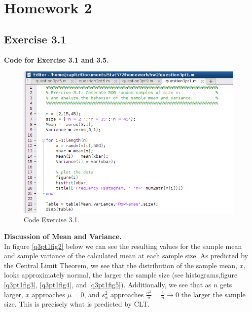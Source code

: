 \documentclass[12pt,a4paper]{article}
\begin{document}
\FloatBarrier

\section*{Homework 2}

\subsection*{Exercise 3.1}
\textbf{Code for Exercise 3.1 and 3.5.}
\begin{figure}[ht!]
\begin{center}
\includegraphics[scale=.50]{q3pt1_code.png}
\caption{Code Exercise 3.1.}
\label{q3pt1fig1}
\end{center}
\end{figure}
\FloatBarrier

\textbf{Discussion of Mean and Variance.}\\

In figure \ref{q3pt1fig2} below we can see the resulting values for the sample mean and sample variance of the calculated mean at each sample size. As predicted by the Central Limit Theorem, we see that the distribution of the sample mean, $\bar{x}$, looks approximately normal, the larger the sample size (see histograms,figure  \ref{q3pt1fig3}, \ref{q3pt1fig4}, and \ref{q3pt1fig5}). Additionally, we see that as $n$ gets larger, $\bar{x}$ approaches $\mu=0$, and $s_{\bar{x}}^2$ approaches $\frac{\sigma^2}{n}=\frac{1}{n}\rightarrow0$  the larger the sample size.  This is precisely what is predicted by CLT.\\
\end{document}
